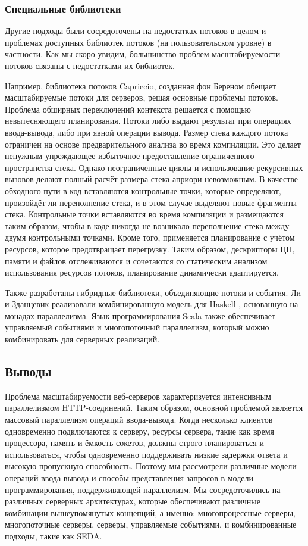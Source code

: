 \subsubsection{Специальные библиотеки}

Другие подходы были сосредоточены на недостатках потоков в целом и проблемах доступных библиотек потоков (на пользовательском уровне) в частности. Как мы скоро увидим, большинство проблем масштабируемости потоков связаны с недостатками их библиотек.

Например, библиотека потоков Capriccio, созданная фон Береном обещает масштабируемые потоки для серверов, решая основные проблемы потоков. Проблема обширных переключений контекста решается с помощью невытесняющего планирования. Потоки либо выдают результат при операциях ввода-вывода, либо при явной операции вывода. Размер стека каждого потока ограничен на основе предварительного анализа во время компиляции. Это делает ненужным упреждающее избыточное предоставление ограниченного пространства стека. Однако неограниченные циклы и использование рекурсивных вызовов делают полный расчёт размера стека априори невозможным. В качестве обходного пути в код вставляются контрольные точки, которые определяют, произойдёт ли переполнение стека, и в этом случае выделяют новые фрагменты стека. Контрольные точки вставляются во время компиляции и размещаются таким образом, чтобы в коде никогда не возникало переполнение стека между двумя контрольными точками. Кроме того, применяется планирование с учётом ресурсов, которое предотвращает перегрузку. Таким образом, дескрипторы ЦП, памяти и файлов отслеживаются и сочетаются со статическим анализом использования ресурсов потоков, планирование динамически адаптируется.

Также разработаны гибридные библиотеки, объединяющие потоки и события. Ли и Зданцевик реализовали комбинированную модель для Haskell \cite{haskell-lib}, основанную на монадах параллелизма. Язык программирования Scala также обеспечивает управляемый событиями и многопоточный параллелизм, который можно комбинировать для серверных реализаций.

\subsection*{Выводы}

Проблема масштабируемости веб-серверов характеризуется интенсивным параллелизмом HTTP-соединений. Таким образом, основной проблемой является массовый параллелизм операций ввода-вывода. Когда несколько клиентов одновременно подключаются к серверу, ресурсы сервера, такие как время процессора, память и ёмкость сокетов, должны строго планироваться и использоваться, чтобы одновременно поддерживать низкие задержки ответа и высокую пропускную способность. Поэтому мы рассмотрели различные модели операций ввода-вывода и способы представления запросов в модели программирования, поддерживающей параллелизм. Мы сосредоточились на различных серверных архитектурах, которые обеспечивают различные комбинации вышеупомянутых концепций, а именно: многопроцессные серверы, многопоточные серверы, серверы, управляемые событиями, и комбинированные подходы, такие как SEDA.

